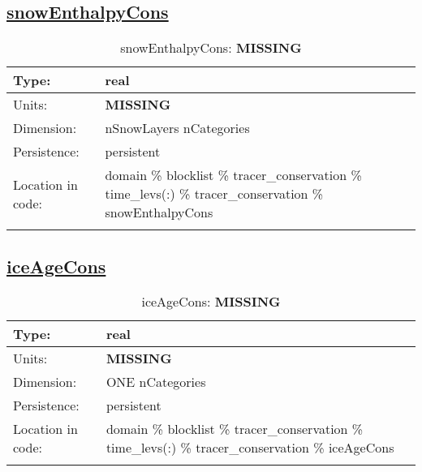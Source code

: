 \subsection[snowEnthalpyCons]{\hyperref[sec:var_tab_tracer_conservation]{snowEnthalpyCons}}
\label{subsec:var_sec_tracer_conservation_snowEnthalpyCons}
\begin{center}
\begin{longtable}{| p{2.0in} | p{4.0in} |}
        \hline 
        Type: & real \\
        \hline 
        Units: & {\bf \color{red} MISSING} \\
        \hline 
        Dimension: & nSnowLayers nCategories \\
        \hline 
        Persistence: & persistent \\
        \hline 
         Location in code: & domain \% blocklist \% tracer\_conservation \% time\_levs(:) \% tracer\_conservation \% snowEnthalpyCons \\
         \hline 
    \caption{snowEnthalpyCons: {\bf \color{red} MISSING}}
\end{longtable}
\end{center}
\subsection[iceAgeCons]{\hyperref[sec:var_tab_tracer_conservation]{iceAgeCons}}
\label{subsec:var_sec_tracer_conservation_iceAgeCons}
\begin{center}
\begin{longtable}{| p{2.0in} | p{4.0in} |}
        \hline 
        Type: & real \\
        \hline 
        Units: & {\bf \color{red} MISSING} \\
        \hline 
        Dimension: & ONE nCategories \\
        \hline 
        Persistence: & persistent \\
        \hline 
         Location in code: & domain \% blocklist \% tracer\_conservation \% time\_levs(:) \% tracer\_conservation \% iceAgeCons \\
         \hline 
    \caption{iceAgeCons: {\bf \color{red} MISSING}}
\end{longtable}
\end{center}
